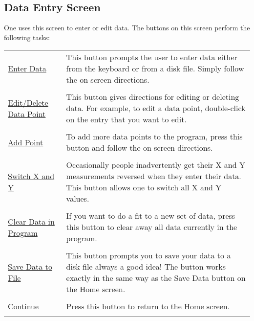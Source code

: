 \subsection*{Data Entry Screen}

One uses this screen to enter or edit data.  The buttons on this
screen perform the following tasks:


\begin{tabular} {l p{3in}}
\underline{Enter Data}     &   This button prompts the user to enter
                               data either from the keyboard or from a
                               disk file.  Simply follow the on-screen
                               directions.  \\ \\
%
\underline{Edit/Delete Data Point} \hspace{1in} &
                               This button gives directions for
                               editing or deleting data.  For example,
                               to edit a data point, double-click on
                               the entry that you
                               want to edit. \\ \\

\underline{Add Point} &	       To add more data points to the
                               program, press this button and follow
                               the on-screen directions.  \\ \\


\underline{Switch X and Y}  &  Occasionally people inadvertently get
                               their X and Y measurements reversed
                               when they enter their data.  This
                               button allows one to switch all X and Y
                               values.  \\ \\


\underline{Clear Data in Program}  &	
                               If you want to do a fit to a new set of
                               data, press this button to clear away
                               all data currently in the program.\\ \\

\underline{Save Data to File}	&
                               This button prompts you to save your
                               data to a disk file always a good idea!
                               The button works exactly in the same way
                               as the Save Data button on the Home
                               screen.  \\ \\

\underline{Continue}  &  Press this button to return to the Home
                         screen. \\ \\


\end{tabular}

